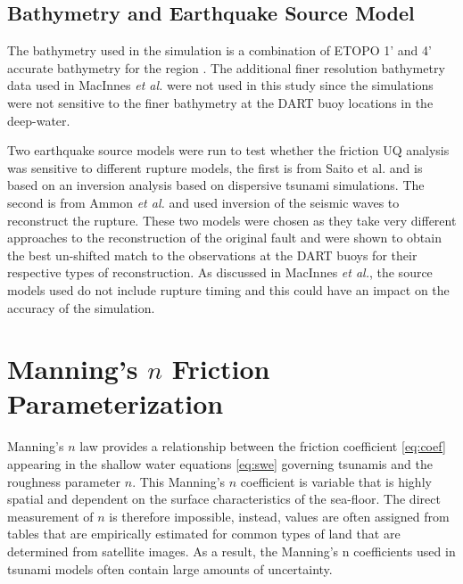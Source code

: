 \subsection{Bathymetry and Earthquake Source Model}

The bathymetry used in the simulation is a combination of ETOPO 1' and 4'
accurate bathymetry for the region \cite{Amante:2009ud}.  The additional finer
resolution bathymetry data used in MacInnes \emph{et al.} were not used in this
study since the simulations were not sensitive to the finer bathymetry at the
DART buoy locations in the deep-water.

Two earthquake source models were run to test whether the friction UQ analysis
was sensitive to different rupture models, the first is from Saito et al.
\cite{Saito:2011bh} and is based on an inversion analysis based on dispersive
tsunami simulations.  The second is from Ammon \emph{et al.} \cite{Ammon:2011dm} and
used inversion of the seismic waves to reconstruct the rupture.  These two
models were chosen as they take very different approaches to the reconstruction
of the original fault and were shown to obtain the best un-shifted match to the
observations at the DART buoys for their respective types of reconstruction.  As
discussed in MacInnes \emph{et al.}, the source models used do not include rupture
timing and this could have an impact on the accuracy of the simulation.


\section{Manning’s $n$ Friction Parameterization} \label{sec:manning}

Manning's $n$ law provides a relationship between the friction coefficient
\eqref{eq:coef} appearing in the shallow water equations \eqref{eq:swe}
governing tsunamis and the roughness parameter $n$.  This Manning's $n$
coefficient is variable that is highly spatial  and dependent on the surface
characteristics of the sea-floor.  The direct measurement of $n$ is therefore
impossible, instead, values are often assigned from tables that are empirically
estimated for common types of land that are determined from satellite images. As
a result, the Manning’s n coefficients used in tsunami models often contain
large amounts of uncertainty.

